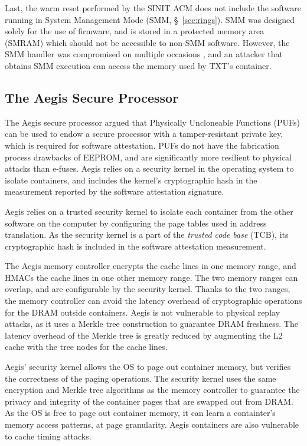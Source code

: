 Last, the warm reset performed by the SINIT ACM does not include the software
running in System Management Mode (SMM, \S~\ref{sec:rings}). SMM was designed
solely for the use of firmware, and is stored in a protected memory area
(SMRAM) which should not be accessible to non-SMM software. However, the SMM
handler was compromised on multiple occasions \cite{duflot2006smm,
rutkowska2008remap, wojtczuk2009smm, wecherowski2009smm, embleton2010smm}, and
an attacker that obtains SMM execution can access the memory used by TXT's
container.


\subsection{The Aegis Secure Processor}

The Aegis secure processor \cite{suh2003aegis} argued that Physically
Uncloneable Functions (PUFs) \cite{gassend2002puf} can be used to endow a
secure processor with a tamper-resistant private key, which is required for
software attestation. PUFs do not have the fabrication process drawbacks of
EEPROM, and are significantly more resilient to physical attacks than e-fuses.
Aegis relies on a security kernel in the operating system to isolate
containers, and includes the kernel's cryptographic hash in the measurement
reported by the software attestation signature.

Aegis relies on a trusted security kernel to isolate each container from the
other software on the computer by configuring the page tables used in address
translation. As the security kernel is a part of the \textit{trusted code base}
(TCB), its cryptographic hash is included in the software attestation
measurement.

The Aegis memory controller encrypts the cache lines in one memory range, and
HMACs the cache lines in one other memory range. The two memory ranges can
overlap, and are configurable by the security kernel. Thanks to the two ranges,
the memory controller can avoid the latency overhead of cryptographic
operations for the DRAM outside containers. Aegis is not vulnerable to physical
replay attacks, as it uses a Merkle tree construction \cite{gassend2003merkle}
to guarantee DRAM freshness. The latency overhead of the Merkle tree is greatly
reduced by augmenting the L2 cache with the tree nodes for the cache lines.

Aegis' security kernel allows the OS to page out container memory, but verifies
the correctness of the paging operations. The security kernel uses the same
encryption and Merkle tree algorithms as the memory controller to guarantee the
privacy and integrity of the container pages that are swapped out from DRAM.
As the OS is free to page out container memory, it can learn a containter's
memory access patterns, at page granularity. Aegis containers are also
vulnerable to cache timing attacks.


